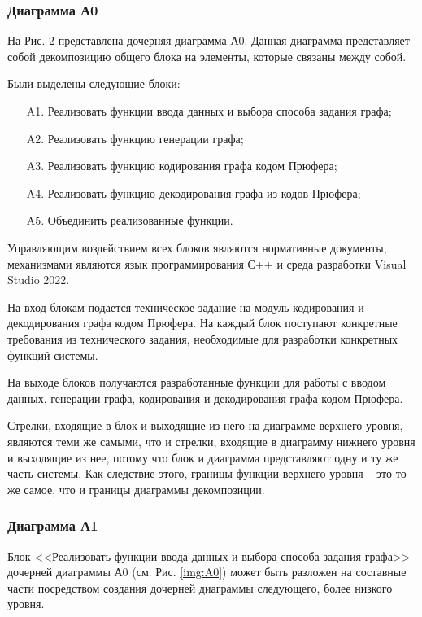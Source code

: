 \documentclass[a4paper, final]{article}
\begin{document}
\subsubsection{Диаграмма А0}

На Рис. 2 представлена дочерняя диаграмма А0. Данная диаграмма представляет собой декомпозицию общего блока на 
элементы, которые связаны между собой.

Были выделены следующие блоки:

\begin{itemize}
	\item[A1.] Реализовать функции ввода данных и выбора способа задания графа;
	\item[A2.] Реализовать функцию генерации графа;
	\item[A3.] Реализовать функцию кодирования графа кодом Прюфера;
	\item[A4.] Реализовать функцию декодирования графа из кодов Прюфера;
	\item[A5.] Объединить реализованные функции.
\end{itemize} 

Управляющим воздействием всех блоков являются нормативные документы, механизмами являются язык программирования С++ 
и среда разработки Visual Studio 2022.

На вход блокам подается техническое задание на модуль кодирования и декодирования графа кодом Прюфера. На каждый 
блок поступают конкретные требования из технического задания, необходимые для разработки конкретных функций системы.

На выходе блоков получаются разработанные функции для работы с вводом данных, генерации графа, кодирования и декодирования
графа кодом Прюфера.

Стрелки, входящие в блок и выходящие из него на диаграмме верхнего уровня, являются теми же самыми, что и стрелки, 
входящие в диаграмму нижнего уровня и выходящие из нее, потому что блок и диаграмма представляют одну и ту же 
часть системы. Как следствие этого, границы функции верхнего уровня 
-- это то же самое, что и границы диаграммы декомпозиции.

\newpage
\hypertarget{img:A0}{}



\subsubsection{Диаграмма А1}
Блок <<Реализовать функции ввода данных и выбора способа задания графа>> дочерней диаграммы А0 (см. Рис. \ref{img:A0}) может 
быть разложен на составные части посредством создания дочерней диаграммы следующего, более низкого уровня.
\end{document}
